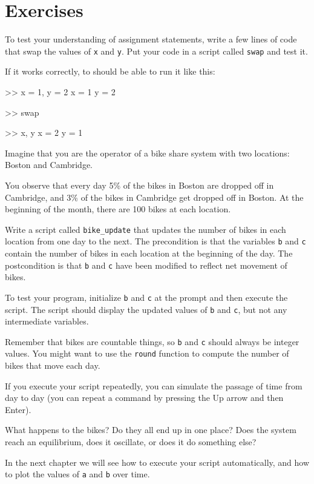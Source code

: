 \documentclass[
]{book}
\numberwithin{Answer}{chapter}
\numberwithin{Exercise}{chapter}
\begin{document}
\section{Exercises}



\begin{ex}
To test your understanding of assignment statements, write a few lines of code that swap the values of {\tt x} and {\tt y}. 
Put your code in a script called {\tt swap} and test it.

If it works correctly, to should be able to run it like this:

\begin{code}
>> x = 1, y = 2
x = 1
y = 2

>> swap

>> x, y
x = 2
y = 1
\end{code}


\end{ex}


\begin{ex}
\label{ex:bikegame}

Imagine that you are the operator of a bike share system with two
locations: Boston and Cambridge.

You observe that every day 5\%
of the bikes in Boston are dropped off in Cambridge, and 3\% of the bikes
in Cambridge get dropped off in Boston.
At the beginning of the month, there are 100 bikes at each location.

Write a script called \verb"bike_update" that updates the number
of bikes in each location from one day to the next.  The precondition
is that the variables {\tt b} and {\tt c} contain the number of bikes
in each location at the beginning of the day.  The postcondition
is that {\tt b} and {\tt c} have been modified to reflect net movement of bikes.

To test your program, initialize {\tt b} and {\tt c} at
the prompt and then execute the script.  The script should display
the updated values of {\tt b} and {\tt c}, but not any intermediate
variables.

Remember that bikes are countable things, so {\tt b} and {\tt c} should always
be integer values.  You might want to use the {\tt round} function
to compute the number of bikes that move each day.

If you execute your script repeatedly, you can simulate the passage
of time from day to day (you can repeat a command by pressing the {\sf Up} arrow and then {\sf Enter}).

What happens to the bikes?  Do they all end up in one place?  Does the system reach an equilibrium, does it oscillate, or does it do something else?

In the next chapter we will see how to execute your script automatically,
and how to plot the values of {\tt a} and {\tt b} over time.
\end{ex}
\end{document}
